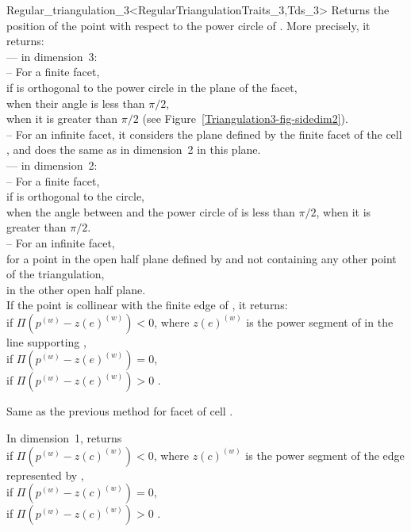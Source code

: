 \begin{ccRefClass}{Regular_triangulation_3<RegularTriangulationTraits_3,Tds_3>}
{Returns the position of the point  with respect to the
power circle of . More precisely, it returns:\\
--- in dimension~3:\\
-- For a finite facet,\\
 if  is orthogonal to the power circle in the
plane of the facet,\\ 
 when their angle is less than $\pi/2$,\\
 when it is greater than $\pi/2$ (see
Figure~\ref{Triangulation3-fig-sidedim2}).\\ 
-- For an infinite facet, it considers the plane defined by the finite
facet of the cell , and does the same as in
dimension~2 in this plane.\\
--- in dimension~2:\\
-- For a finite facet,\\
 if  is orthogonal to the circle,\\
 when the angle between  and the
power circle of  is less than $\pi/2$,
 when it is greater than $\pi/2$.\\ 
-- For an infinite facet,\\
 for a point in the open half plane defined by
 and not containing any other point of the triangulation,\\
 in the other open half plane.\\
If the point  is collinear with the finite edge  of
, it returns:\\
 if $\Pi({p}^{(w)}-{z(e)}^{(w)})<0$, where
${z(e)}^{(w)}$ is the power segment of  in the line supporting
,\\ 
 if $\Pi({p}^{(w)}-{z(e)}^{(w)})=0$,\\
 if $\Pi({p}^{(w)}-{z(e)}^{(w)})>0$ .
}

{Same as the previous method for facet  of cell .}

{In dimension~1, returns\\
 if $\Pi({p}^{(w)}-{z(c)}^{(w)})<0$, where
${z(c)}^{(w)}$ is the power segment of the edge represented by
,\\
 if $\Pi({p}^{(w)}-{z(c)}^{(w)})=0$,\\
 if $\Pi({p}^{(w)}-{z(c)}^{(w)})>0$ .
}


\end{ccRefClass}
